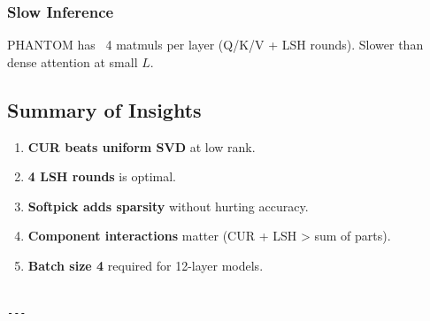 \subsubsection{Slow Inference}

PHANTOM has ~4 matmuls per layer (Q/K/V + LSH rounds). Slower than dense 
attention at small $L$.

\subsection{Summary of Insights}

\begin{enumerate}
\item \textbf{CUR beats uniform SVD} at low rank.
\item \textbf{4 LSH rounds} is optimal.
\item \textbf{Softpick adds sparsity} without hurting accuracy.
\item \textbf{Component interactions} matter (CUR + LSH > sum of parts).
\item \textbf{Batch size 4} required for 12-layer models.
\end{enumerate}
\begin{lstlisting}

---
\end{lstlisting}